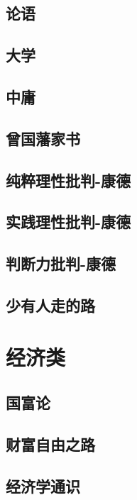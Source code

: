 \documentclass[UTF8,a4paper,12pt]{ctexbook}
\begin{document}
	\section{论语}

	\section{大学}
	
	\section{中庸}
	
	\section{曾国藩家书}
	
	\section{纯粹理性批判-康德}
	
	\section{实践理性批判-康德}
	
	\section{判断力批判-康德}
	
	\section{少有人走的路}
\chapter{经济类}
	\section{国富论}
	
	\section{财富自由之路}

	\section{经济学通识}
	
	
\end{document}
